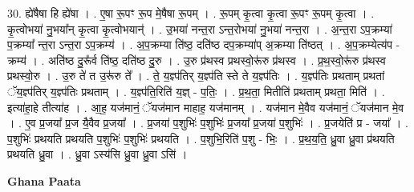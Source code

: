 \documentclass[17pt]{extarticle}
\begin{document}
30. ह्ये॑षैषा हि ह्ये॑षा । . ए॒षा रू॒पꣳ रू॒प मे॒षैषा रू॒पम् । . रू॒पम् कृ॒त्वा कृ॒त्वा रू॒पꣳ रू॒पम् कृ॒त्वा । . कृ॒त्वोभया॑ नु॒भया᳚न् कृ॒त्वा कृ॒त्वोभयान्॑ । . उ॒भया॑ नन्त॒रा ऽन्त॒रोभया॑ नु॒भया॑ नन्त॒रा । . अ॒न्त॒रा ऽप॒क्रम्या॑ प॒क्रम्या᳚ न्त॒रा ऽन्त॒रा ऽप॒क्रम्य॑ । . अ॒प॒क्रम्या ति॑ष्ठ॒ दति॑ष्ठ दप॒क्रम्या॑प् अ॒क्रम्या ति॑ष्ठत् । . अ॒प॒क्रम्येत्य॑प - क्रम्य॑ । . अति॑ष्ठ दु॒रू᳚र्व ति॑ष्ठ॒ दति॑ष्ठ दु॒रु । . उ॒रु प्र॑थस्व प्रथस्वो॒रू॑रु प्र॑थस्व । . प्र॒थ॒स्वो॒रू॑रु प्र॑थस्व प्रथस्वो॒रु । . उ॒रु ते॑ त उ॒रू॑रु ते᳚ । . ते॒ य॒ज्ञ्प॑तिर् य॒ज्ञ्प॑ति स्ते ते य॒ज्ञ्प॑तिः । . य॒ज्ञ्प॑तिः प्रथताम् प्रथतां ॅय॒ज्ञ्प॑तिर् य॒ज्ञ्प॑तिः प्रथताम् । . य॒ज्ञ्प॑ति॒रिति॑ य॒ज्ञ् - प॒तिः॒ । . प्र॒थ॒ता॒ मितीति॑ प्रथताम् प्रथता॒ मिति॑ । . इत्या॑हा॒हे तीत्या॑ह । . आ॒ह॒ यज॑मानं॒ ॅयज॑मान माहाह॒ यज॑मानम् । . यज॑मान मे॒वैव यज॑मानं॒ ॅयज॑मान मे॒व । . ए॒व प्र॒जया᳚ प्र॒ज यै॒वैव प्र॒जया᳚ । . प्र॒जया॑ प॒शुभिः॑ प॒शुभिः॑ प्र॒जया᳚ प्र॒जया॑ प॒शुभिः॑ । . प्र॒जयेति॑ प्र - जया᳚ । . प॒शुभिः॑ प्रथयति प्रथयति प॒शुभिः॑ प॒शुभिः॑ प्रथयति । . प॒शुभि॒रिति॑ प॒शु - भिः॒ । . प्र॒थ॒य॒ति॒ ध्रु॒वा ध्रु॒वा प्र॑थयति प्रथयति ध्रु॒वा । . ध्रु॒वा ऽस्य॑सि ध्रु॒वा ध्रु॒वा ऽसि॑ । \newline

\textbf{Ghana Paata } \newline
\end{document}
